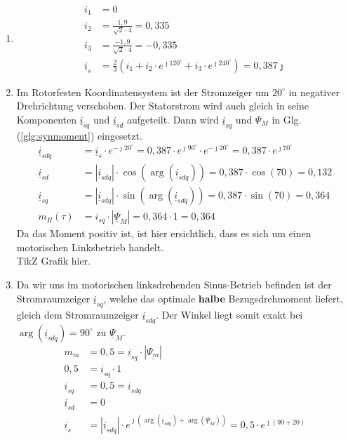 \begin{solution}
\begin{enumerate}
\item 
\begin{align}
i_1 &= 0\\
i_2 &= \frac{1,9}{\sqrt{2} \cdot 4}= 0,335\\
i_3 &= \frac{-1,9}{\sqrt{2} \cdot 4}= -0,335\\
\underline{i}_s &= \frac{2}{3} \left ( i_1 + i_2 \cdot e^{\jmath 120^\circ} + i_3 \cdot e^{\jmath 240^\circ}  \right ) = 0,387 \jmath
\end{align}
\item Im Rotorfesten Koordinatensystem ist der Stromzeiger um $20^\circ$ in negativer Drehrichtung verschoben. Der Statorstrom wird auch gleich in seine Komponenten $\underline{i}_{sq}$ und $\underline{i}_{sd}$ aufgeteilt. Dann wird $\underline{i}_{sq}$ und $\Psi_M$ in Glg.(\ref{glg:synmoment}) eingesetzt.
\begin{align}
\underline{i}_{sdq} & = \underline{i}_s \cdot e^{-\jmath 20 ^\circ} = 0,387 \cdot e^{\jmath 90 ^\circ} \cdot e^{-\jmath 20 ^\circ} = 0,387 \cdot e^{\jmath 70 ^\circ} \\
\underline{i}_{sd} & = |\underline{i}_{sdq}| \cdot \cos(\arg(\underline{i}_{sdq})) = 0,387 \cdot \cos(70) = 0,132 \\
\underline{i}_{sq} & = |\underline{i}_{sdq}| \cdot \sin(\arg(\underline{i}_{sdq})) = 0,387 \cdot \sin(70) = 0,364 \\
m_R(\tau)& =  i_{sq} \cdot | \underline{\Psi}_M|= 0,364\cdot 1 = 0,364
\end{align}
Da das Moment positiv ist, ist hier ersichtlich, dass es sich um einen motorischen Linksbetrieb handelt.\\
TikZ Grafik hier.
\item Da wir uns im motorischen linksdrehenden Sinus-Betrieb befinden ist der Stromraumzeiger $\underline{i}_{sq}$, welche das optimale \textbf{halbe} Bezugsdrehmoment liefert, gleich dem Stromraumzeiger $\underline{i}_{sdq}$. Der Winkel liegt somit exakt bei $\arg(\underline{i}_{sdq})=90^\circ$ zu $\underline{\Psi}_M$.
\begin{align}
m_m &= 0,5 = \underline{i}_{sq} \cdot |\underline{\Psi_m}|\\
0,5 &= \underline{i}_{sq} \cdot 1\\
\underline{i}_{sq} &= 0,5 = \underline{i}_{sdq} \\
\underline{i}_{sd} &= 0\\
\underline{i}_{s} &= |\underline{i}_{sdq}| \cdot e^{\jmath (\arg(\underline{i}_{sdq}) + \arg(\underline{\Psi}_{M}))}= 0,5 \cdot e^{\jmath (90 + 20)}

\end{align}
\end{enumerate}
\end{solution}

